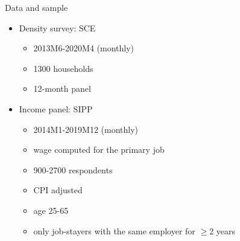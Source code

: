 \documentclass{beamer}
\begin{document}
\begin{frame}{Data and sample}
	\begin{itemize}
		\item Density survey: SCE
		\begin{itemize}
			\item 2013M6-2020M4   (monthly)
			\item 1300 households 
			\item 12-month panel 
		\end{itemize}
\item Income panel: SIPP
\begin{itemize}
	\item 2014M1-2019M12 (monthly)
	\item wage computed for the primary job 
	\item 900-2700 respondents 
		\item CPI adjusted 
	\item age 25-65 
	\item only job-stayers with the same employer for $\geq$2 years
	

\end{itemize}
\end{itemize}
\end{frame}


\end{document}
